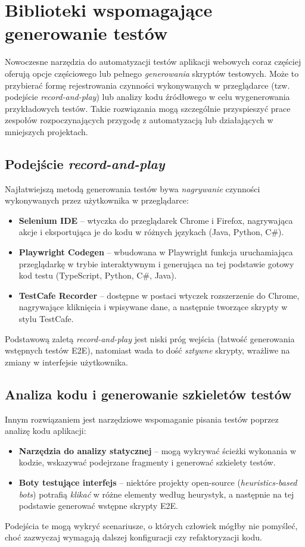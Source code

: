 \documentclass[12pt]{report}
\begin{document}
\section{Biblioteki wspomagające generowanie testów}
\label{sec:biblioteki-generujace}
Nowoczesne narzędzia do automatyzacji testów aplikacji webowych coraz częściej oferują opcje częściowego lub pełnego \emph{generowania} skryptów testowych. Może to przybierać formę rejestrowania czynności wykonywanych w przeglądarce (tzw. podejście \emph{record-and-play}) lub analizy kodu źródłowego w celu wygenerowania przykładowych testów. Takie rozwiązania mogą szczególnie przyspieszyć prace zespołów rozpoczynających przygodę z automatyzacją lub działających w mniejszych projektach.

\subsection*{Podejście \emph{record-and-play}}
Najłatwiejszą metodą generowania testów bywa \emph{nagrywanie} czynności wykonywanych przez użytkownika w przeglądarce:
\begin{itemize}
    \item \textbf{Selenium IDE} -- wtyczka do przeglądarek Chrome i Firefox, nagrywająca akcje i eksportująca je do kodu w różnych językach (Java, Python, C\#).
    \item \textbf{Playwright Codegen} -- wbudowana w Playwright funkcja uruchamiająca przeglądarkę w trybie interaktywnym i generująca na tej podstawie gotowy kod testu (TypeScript, Python, C\#, Java).
    \item \textbf{TestCafe Recorder} -- dostępne w postaci wtyczek rozszerzenie do Chrome, nagrywające kliknięcia i wpisywane dane, a następnie tworzące skrypty w stylu TestCafe.
\end{itemize}
Podstawową zaletą \emph{record-and-play} jest niski próg wejścia (łatwość generowania wstępnych testów E2E), natomiast wada to dość \emph{sztywne} skrypty, wrażliwe na zmiany w interfejsie użytkownika.

\subsection*{Analiza kodu i generowanie szkieletów testów}
Innym rozwiązaniem jest narzędziowe wspomaganie pisania testów poprzez analizę kodu aplikacji:
\begin{itemize}
    \item \textbf{Narzędzia do analizy statycznej} -- mogą wykrywać ścieżki wykonania w kodzie, wskazywać podejrzane fragmenty i generować szkielety testów.
    \item \textbf{Boty testujące interfejs} -- niektóre projekty open-source (\emph{heuristics-based bots}) potrafią \emph{klikać} w różne elementy według heurystyk, a następnie na tej podstawie generować wstępne skrypty E2E.
\end{itemize}
Podejścia te mogą wykryć scenariusze, o których człowiek mógłby nie pomyśleć, choć zazwyczaj wymagają dalszej konfiguracji czy refaktoryzacji kodu.
\end{document}
